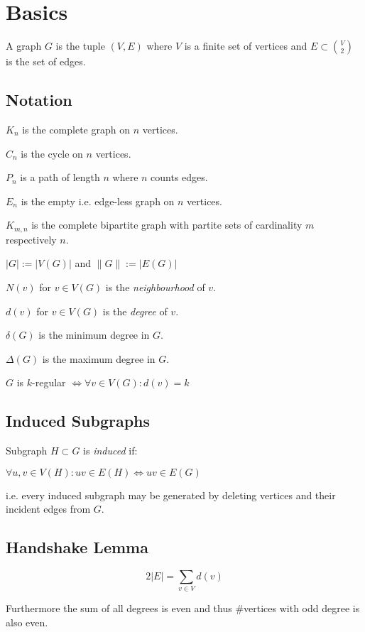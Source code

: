 \section*{Basics}

A graph $G$ is the tuple $(V,E)$ where $V$ is a finite set of vertices and $E \subset {V \choose 2}$ is the set of edges.

\subsection*{Notation}

$K_n$ is the complete graph on $n$ vertices.

$C_n$ is the cycle on $n$ vertices.

$P_n$ is a path of length $n$ where $n$ counts edges.

$E_n$ is the empty i.e. edge-less graph on $n$ vertices.

$K_{m,n}$ is the complete bipartite graph with partite sets of cardinality $m$ respectively $n$.

\spacing

$|G| := |V(G)|$ and $\|G\| := |E(G)|$

$N(v)$ for $v \in V(G)$ is the \emph{neighbourhood} of $v$.

$d(v)$ for $v \in V(G)$ is the \emph{degree} of $v$.

$\delta(G)$ is the minimum degree in $G$.

$\Delta(G)$ is the maximum degree in $G$.

$G$ is $k$-regular $\iff \forall v \in V(G) : d(v) = k$

\subsection*{Induced Subgraphs}

Subgraph $H \subset G$ is \emph{induced} if:

$\forall u, v \in V(H) : uv \in E(H) \iff uv \in E(G)$

i.e. every induced subgraph may be generated by deleting vertices and their incident edges from $G$.

\subsection*{Handshake Lemma}

$$2|E| = \sum_{v \in V} d(v)$$

Furthermore the sum of all degrees is even and thus \#vertices with odd degree is also even.

